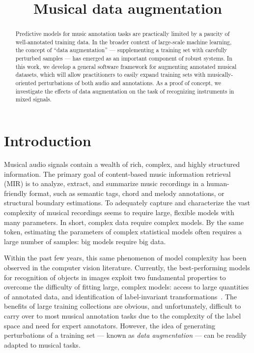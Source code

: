 \documentclass{article}
\title{Musical data augmentation}
\begin{document}
%
\maketitle
%
\begin{abstract}
Predictive models for music annotation tasks are practically limited by a paucity of
well-annotated training data.
In the broader context of large-scale machine learning, the concept of ``data
augmentation'' --- supplementing a training set with carefully perturbed samples ---
has emerged as an important component of robust systems.
In this work, we develop a general software framework for augmenting annotated 
musical datasets, which will allow practitioners to easily expand training sets 
with musically-oriented perturbations of both audio and annotations.
As a proof of concept, we investigate the effects of data augmentation on 
the task of recognizing instruments in mixed signals.
\end{abstract}
%
\section{Introduction}
\label{sec:introduction}


Musical audio signals contain a wealth of rich, complex, and highly structured
information.  The primary goal of content-based music information retrieval (MIR) is to
analyze, extract, and summarize music recordings in a human-friendly
format, such as semantic tags, chord and melody annotations, or structural boundary
estimations.  To adequately capture and characterize the vast complexity of musical
recordings seems to require large, flexible models with many parameters.  
In short, complex data require complex models.
By the same token, estimating the parameters of complex statistical models often requires
a large number of samples: big models require big data.

Within the past few years, this same phenomenon of model complexity has been observed 
in the computer vision literature.  Currently, the best-performing models for recognition 
of objects in images exploit two fundamental properties to overcome the difficulty of 
fitting large, complex models: access to large quantities of annotated data, and 
identification of label-invariant transformations~\cite{krizhevsky2012imagenet}.
The benefits of large training collections are obvious, and unfortunately, difficult to 
carry over to most musical annotation tasks due to the complexity of the label space and
need for expert annotators.  However, the idea of generating perturbations of a training
set --- known as \emph{data augmentation} --- can be readily adapted to musical tasks.
\end{document}
